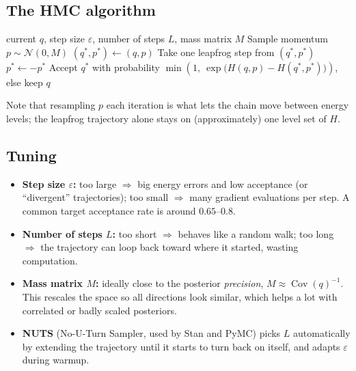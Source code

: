 \documentclass[11pt]{article}
\begin{document}
\subsection{The HMC algorithm}
\begin{algorithm}[h]
\caption{Hamiltonian Monte Carlo (one iteration)}
\begin{algorithmic}[1]
\Require current $q$, step size $\varepsilon$, number of steps $L$, mass matrix $M$
\State Sample momentum $p \sim \mathcal{N}(0, M)$
\State $(q^*, p^*) \gets (q, p)$
    \State Take one leapfrog step from $(q^*, p^*)$
\EndFor
\State $p^* \gets -p^*$ 
\State Accept $q^*$ with probability $\min\!\left(1,\ \exp\big(H(q, p) - H(q^*, p^*)\big)\right)$, else keep $q$
\end{algorithmic}
\end{algorithm}

Note that resampling $p$ each iteration is what lets the chain move between energy levels; the leapfrog trajectory alone stays on (approximately) one level set of $H$.

\subsection{Tuning}
\begin{itemize}
    \item \textbf{Step size $\varepsilon$:} too large $\Rightarrow$ big energy errors and low acceptance (or ``divergent'' trajectories); too small $\Rightarrow$ many gradient evaluations per step. A common target acceptance rate is around $0.65$--$0.8$.
    \item \textbf{Number of steps $L$:} too short $\Rightarrow$ behaves like a random walk; too long $\Rightarrow$ the trajectory can loop back toward where it started, wasting computation.
    \item \textbf{Mass matrix $M$:} ideally close to the posterior \emph{precision}, $M \approx \operatorname{Cov}(q)^{-1}$. This rescales the space so all directions look similar, which helps a lot with correlated or badly scaled posteriors.
    \item \textbf{NUTS} (No-U-Turn Sampler, used by Stan and PyMC) picks $L$ automatically by extending the trajectory until it starts to turn back on itself, and adapts $\varepsilon$ during warmup.
\end{itemize}
\end{document}
